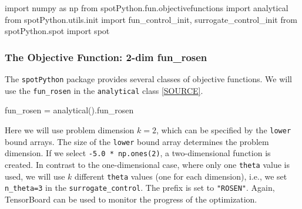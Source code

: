 \documentclass[
  letterpaper,
  DIV=11,
  numbers=noendperiod]{scrreprt}
\newenvironment{Shaded}{\begin{snugshade}}{\end{snugshade}}
\newcommand{\ImportTok}[1]{\textcolor[rgb]{0.00,0.46,0.62}{#1}}
\newcommand{\NormalTok}[1]{\textcolor[rgb]{0.00,0.23,0.31}{#1}}
\newcommand{\OperatorTok}[1]{\textcolor[rgb]{0.37,0.37,0.37}{#1}}
\begin{document}
\begin{Shaded}
\begin{Highlighting}[]
\ImportTok{import}\NormalTok{ numpy }\ImportTok{as}\NormalTok{ np}
\ImportTok{from}\NormalTok{ spotPython.fun.objectivefunctions }\ImportTok{import}\NormalTok{ analytical}
\ImportTok{from}\NormalTok{ spotPython.utils.init }\ImportTok{import}\NormalTok{ fun\_control\_init, surrogate\_control\_init}
\ImportTok{from}\NormalTok{ spotPython.spot }\ImportTok{import}\NormalTok{ spot}
\end{Highlighting}
\end{Shaded}

\subsubsection{The Objective Function: 2-dim
fun\_rosen}\label{the-objective-function-2-dim-fun_rosen}

The \texttt{spotPython} package provides several classes of objective
functions. We will use the \texttt{fun\_rosen} in the
\texttt{analytical} class
\href{https://github.com/sequential-parameter-optimization/spotPython/blob/main/src/spotPython/fun/objectivefunctions.py}{{[}SOURCE{]}}.

\begin{Shaded}
\begin{Highlighting}[]
\NormalTok{fun\_rosen }\OperatorTok{=}\NormalTok{ analytical().fun\_rosen}
\end{Highlighting}
\end{Shaded}

Here we will use problem dimension \(k=2\), which can be specified by
the \texttt{lower} bound arrays. The size of the \texttt{lower} bound
array determines the problem dimension. If we select
\texttt{-5.0\ *\ np.ones(2)}, a two-dimensional function is created. In
contrast to the one-dimensional case, where only one \texttt{theta}
value is used, we will use \(k\) different \texttt{theta} values (one
for each dimension), i.e., we set \texttt{n\_theta=3} in the
\texttt{surrogate\_control}. The prefix is set to \texttt{"ROSEN"}.
Again, TensorBoard can be used to monitor the progress of the
optimization.
\end{document}
